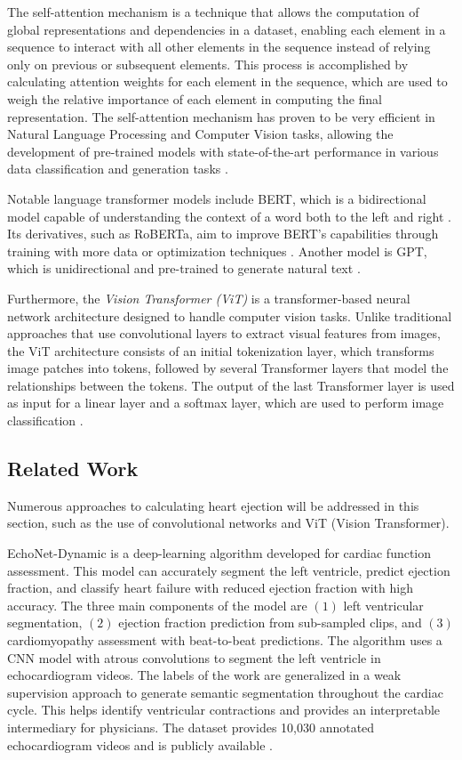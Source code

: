 \documentclass[a4paper,fleqn]{cas-dc}
\begin{document}
The self-attention mechanism is a technique that allows the computation of global representations and dependencies in a dataset, enabling each element in a sequence to interact with all other elements in the sequence instead of relying only on previous or subsequent elements. This process is accomplished by calculating attention weights for each element in the sequence, which are used to weigh the relative importance of each element in computing the final representation. The self-attention mechanism has proven to be very efficient in Natural Language Processing and Computer Vision tasks, allowing the development of pre-trained models with state-of-the-art performance in various data classification and generation tasks \cite{RUAN20221}.

Notable language transformer models include BERT, which is a bidirectional model capable of understanding the context of a word both to the left and right \cite{https://doi.org/10.48550/arxiv.1810.04805}. Its derivatives, such as RoBERTa, aim to improve BERT's capabilities through training with more data or optimization techniques \cite{Roberta,DistilBERT}. Another model is GPT, which is unidirectional and pre-trained to generate natural text \cite{https://doi.org/10.48550/arxiv.2005.14165}.

Furthermore, the \textit{Vision Transformer (ViT)} is a transformer-based neural network architecture designed to handle computer vision tasks. Unlike traditional approaches that use convolutional layers to extract visual features from images, the ViT architecture consists of an initial tokenization layer, which transforms image patches into tokens, followed by several Transformer layers that model the relationships between the tokens. The output of the last Transformer layer is used as input for a linear layer and a softmax layer, which are used to perform image classification \cite{https://doi.org/10.48550/arxiv.2010.11929}.

\subsection{Related Work}

Numerous approaches to calculating heart ejection will be addressed in this section, such as the use of convolutional networks and ViT (Vision Transformer).

EchoNet-Dynamic is a deep-learning algorithm developed for cardiac function assessment. This model can accurately segment the left ventricle, predict ejection fraction, and classify heart failure with reduced ejection fraction with high accuracy. The three main components of the model are $(1)$ left ventricular segmentation, $(2)$ ejection fraction prediction from sub-sampled clips, and $(3)$ cardiomyopathy assessment with beat-to-beat predictions. The algorithm uses a CNN model with atrous convolutions to segment the left ventricle in echocardiogram videos. The labels of the work are generalized in a weak supervision approach to generate semantic segmentation throughout the cardiac cycle. This helps identify ventricular contractions and provides an interpretable intermediary for physicians. The dataset provides 10,030 annotated echocardiogram videos and is publicly available \cite{Ouyang2019}.
\end{document}

